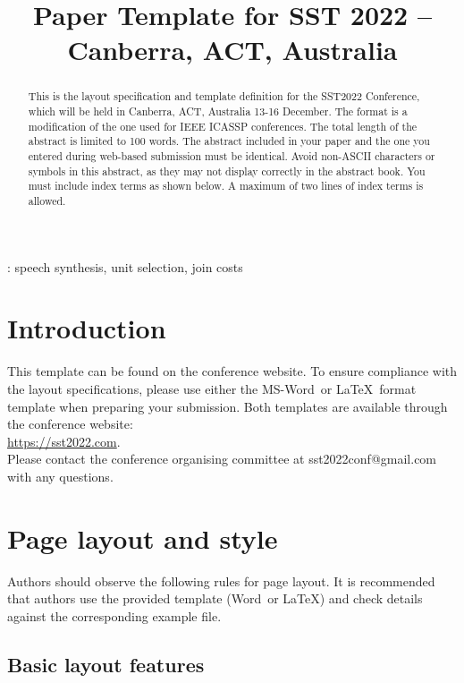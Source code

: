 \documentclass[a4paper]{article}
\title{Paper Template for SST 2022 -- Canberra, ACT, Australia}
\def\reg{{\rm\ooalign{\hfil
     \raise.07ex\hbox{\scriptsize R}\hfil\crcr\mathhexbox20D}}}
\begin{document}
\maketitle
%
\begin{abstract}
This is the layout specification and template definition for the SST2022 Conference, which will be held in Canberra, ACT, Australia 13-16 December. The format is a modification of the one used for IEEE ICASSP conferences. The total length of the abstract is limited to 100 words. The abstract included in your paper and the one you entered during web-based submission must be identical. Avoid non-ASCII characters or symbols in this abstract, as they may not display correctly in the abstract book. You must include index terms as shown below. A maximum of two lines of index terms is allowed. \end{abstract}
: speech synthesis, unit selection, join costs

%
\section{Introduction}

This template can be found on the conference website. To ensure compliance with the layout specifications, please use either the MS-Word\reg\ or \LaTeX\ format template when preparing your
submission. 
Both templates are available through the conference website:\\\href{https://sst2022.com}{https://sst2022.com}.\\Please contact the conference organising committee at sst2022conf@gmail.com with any questions.

\section{Page layout and style}

Authors should observe the following rules for page layout. It is recommended that authors use the provided template (Word\reg\ or \LaTeX) and check details against the corresponding example file.

\subsection{Basic layout features}
\end{document}
